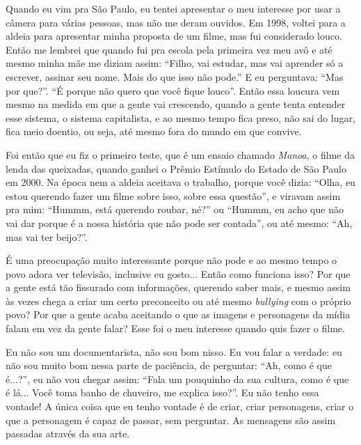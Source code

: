 Quando eu vim pra São Paulo, eu tentei apresentar o meu interesse por
usar a câmera para várias pessoas, mas não me deram ouvidos. Em 1998,
voltei para a aldeia para apresentar minha proposta de um filme, mas fui
considerado louco. Então me lembrei que quando fui pra escola pela
primeira vez meu avô e até mesmo minha mãe me diziam assim: ``Filho, vai
estudar, mas vai aprender só a escrever, assinar seu nome. Mais do que
isso não pode.'' E eu perguntava: ``Mas por que?''. ``É porque não quero
que você fique louco''. Então essa loucura vem mesmo na medida em que a
gente vai crescendo, quando a gente tenta entender esse sistema, o
sistema capitalista, e ao mesmo tempo fica preso, não sai do lugar, fica
meio doentio, ou seja, até mesmo fora do mundo em que convive.

Foi então que eu fiz o primeiro teste, que é um ensaio chamado
\emph{Manoa}, o filme da lenda das queixadas, quando ganhei o Prêmio
Estímulo do Estado de São Paulo em 2000. Na época nem a aldeia aceitava
o trabalho, porque você dizia: ``Olha, eu estou querendo fazer um filme
sobre isso, sobre essa questão'', e viravam assim pra mim: ``Hummm, está
querendo roubar, né?'' ou ``Hummm, eu acho que não vai dar porque é a
nossa história que não pode ser contada'', ou até mesmo: ``Ah, mas vai
ter beijo?''.

É uma preocupação muito interessante porque não pode e ao mesmo tempo o
povo adora ver televisão, inclusive eu gosto... Então como funciona
isso? Por que a gente está tão fissurado com informações, querendo saber
mais, e mesmo assim às vezes chega a criar um certo preconceito ou até
mesmo \emph{bullying} com o próprio povo? Por que a gente acaba
aceitando o que as imagens e personagens da mídia falam em vez da gente
falar? Esse foi o meu interesse quando quis fazer o filme.

Eu não sou um documentarista, não sou bom nisso. Eu vou falar a verdade:
eu não sou muito bom nessa parte de paciência, de perguntar: ``Ah, como
é que é...?'', eu não vou chegar assim: ``Fala um pouquinho da sua
cultura, como é que é lá... Você toma banho de chuveiro, me explica
isso?''. Eu não tenho essa vontade! A única coisa que eu tenho vontade é
de criar, criar personagens, criar o que a personagem é capaz de passar,
sem perguntar. As mensagens são assim passadas através da sua arte.

